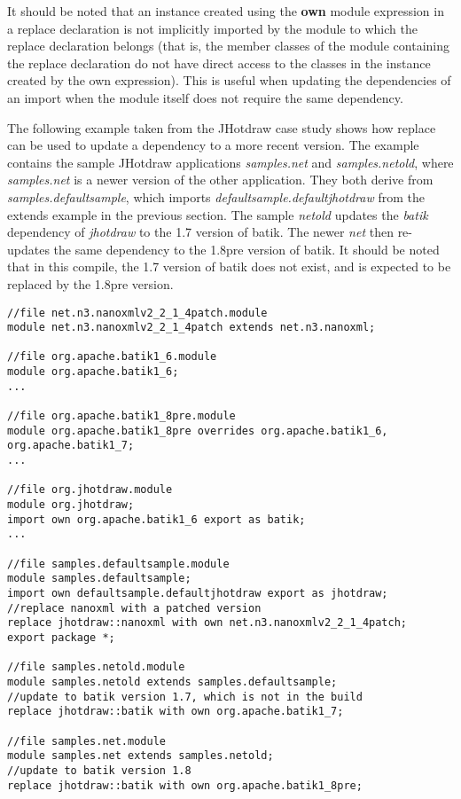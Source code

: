 It should be noted that an instance created using the \textbf{own} module expression in 
a replace declaration is not
implicitly imported by the module to which the replace declaration belongs (that is, the member
classes of the module containing the replace declaration do not have direct access to the
classes in the instance created by the own expression). This
is useful when updating the dependencies of an import when the module itself
does not require the same dependency.

The following example taken from the JHotdraw case study shows how replace can
be used to update a dependency to a more recent version. The example contains
the sample JHotdraw applications \textit{samples.net} and \textit{samples.netold}, 
where \textit{samples.net} is a newer version of the other application. They both 
derive from \textit{samples.defaultsample}, which imports \textit{defaultsample.defaultjhotdraw} 
from the extends example in the previous section. The sample \textit{netold} updates 
the \textit{batik} dependency of \textit{jhotdraw} to the 1.7 version of batik.
The newer \textit{net} then re-updates the same dependency to the 1.8pre version of batik.
It should be noted that in this compile, the 1.7 version of batik does not exist, and
is expected to be replaced by the 1.8pre version.

\begin{lstlisting}[caption=Replace]
//file net.n3.nanoxmlv2_2_1_4patch.module
module net.n3.nanoxmlv2_2_1_4patch extends net.n3.nanoxml;

//file org.apache.batik1_6.module
module org.apache.batik1_6;
...

//file org.apache.batik1_8pre.module
module org.apache.batik1_8pre overrides org.apache.batik1_6, org.apache.batik1_7;
...

//file org.jhotdraw.module
module org.jhotdraw;
import own org.apache.batik1_6 export as batik;
...

//file samples.defaultsample.module
module samples.defaultsample;
import own defaultsample.defaultjhotdraw export as jhotdraw;
//replace nanoxml with a patched version
replace jhotdraw::nanoxml with own net.n3.nanoxmlv2_2_1_4patch;
export package *;

//file samples.netold.module
module samples.netold extends samples.defaultsample;
//update to batik version 1.7, which is not in the build
replace jhotdraw::batik with own org.apache.batik1_7;

//file samples.net.module
module samples.net extends samples.netold;
//update to batik version 1.8
replace jhotdraw::batik	with own org.apache.batik1_8pre;
\end{lstlisting}

